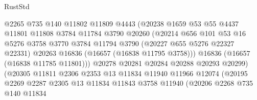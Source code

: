 \begin{lexlean}{RustStd}
\begin{coremodule}
                                @2265
                                @735
                                @140
                                @11802
                                @11809
                                @4443
                                (@20238
                                  @1659
                                  @53
                                  @55
                                  @4437
                                  @11801
                                  @11808
                                  @3784
                                  @11784
                                  @3790
                                  @20260
                                  (@20214
                                    @656
                                    @101
                                    @53
                                    @16
                                    @5276
                                    @3758
                                    @3770
                                    @3784
                                    @11794
                                    @3790
                                    (@20227 @655 @5276 @22327 @22331)
                                    @20263
                                    @16836
                                    (@16657 (@16838 @11795 @3758)))
                                  @16836
                                  (@16657 (@16838 @11785 @11801)))
                                @20278
                                @20281
                                @20284
                                @20288
                                @20293
                                @20299)
                              (@20305
                                @11811
                                @2306
                                @2353
                                @13
                                @11834
                                @11940
                                @11966
                                @12074
                                (@20195
                                  @2269
                                  @2287
                                  @2305
                                  @13
                                  @11834
                                  @11843
                                  @3758
                                  @11940
                                  (@20206
                                    @2268
                                    @735
                                    @140
                                    @11834

\end{coremodule}
\end{lexlean}
